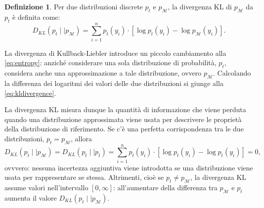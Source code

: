 \documentclass[
  10pt,
  italian,
  a4paper,
  extrafontsizes,onecolumn,openright
  ]{memoir}
\newlength{\rf}
\theoremstyle{definition}
\newtheorem{definition}{Definizione}[chapter]
\theoremstyle{definition}
\theoremstyle{definition}
\theoremstyle{definition}
\theoremstyle{remark}
\begin{document}
\begin{definition}
Per due distribuzioni discrete \(p_t\) e \(p_{\mathcal{M}}\), la divergenza KL di \(p_{\mathcal{M}}\) da \(p_t\) è definita come:
\begin{equation}
D_{KL}(p_t \mid\mid p_{\mathcal{M}})  = \sum_{i=1}^n p_t(y_i) \cdot \left[\log p_t(y_i) - \log p_{\mathcal{M}}(y_i)\right].
\label{eq:kldivergence}
\end{equation}
\end{definition}

La divergenza di Kullback-Liebler introduce un piccolo cambiamento alla \eqref{eq:entropy}: anziché considerare una sola distribuzione di probabilità, \(p_t\), considera anche una approssimazione a tale distribuzione, ovvero \(p_{\mathcal{M}}\). Calcolando la differenza dei logaritmi dei valori delle due distribuzioni si giunge alla \eqref{eq:kldivergence}.

La divergenza KL misura dunque la quantità di informazione che viene perduta quando una distribuzione approssimata viene usata per descrivere le proprietà della distribuzione di riferimento.
Se c'è una perfetta corrispondenza tra le due distribuzioni, \(p_t = p_{\mathcal{M}}\), allora
\[
D_{KL}(p_t \mid\mid p_{\mathcal{M}}) = D_{KL}(p_t \mid\mid p_t) = \sum_{i=1}^n p_t(y_i) \cdot \left[\log p_t(y_i) - \log p_t(y_i)\right] = 0,
\]
ovvvero: nessuna incertezza aggiuntiva viene introdotta se una distribuzione viene usata per rappresentare se stessa. Altrimenti, cioè se \(p_t \neq p_{\mathcal{M}}\), la divergenza KL assume valori nell'intervallo \([0, \infty]\): all'aumentare della differenza tra \(p_{\mathcal{M}}\) e \(p_t\) aumenta il valore \(D_{KL}(p_t \mid\mid p_{\mathcal{M}})\).
\end{document}
